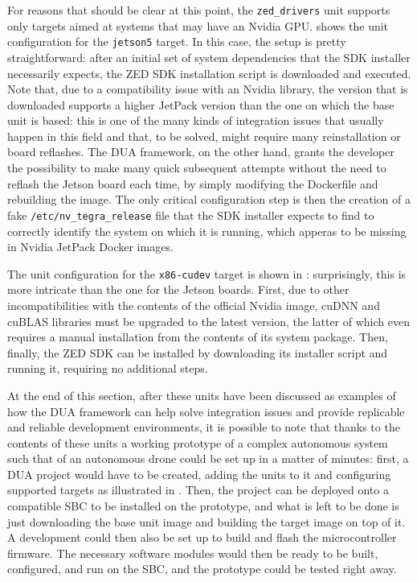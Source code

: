 For reasons that should be clear at this point, the \texttt{zed\_drivers} unit supports only targets aimed at systems that may have an Nvidia GPU.  shows the unit configuration for the \texttt{jetson5} target. In this case, the setup is pretty straightforward: after an initial set of system dependencies that the SDK installer necessarily expects, the ZED SDK installation script is downloaded and executed. Note that, due to a compatibility issue with an Nvidia library, the version that is downloaded supports a higher JetPack version than the one on which the base unit is based: this is one of the many kinds of integration issues that usually happen in this field and that, to be solved, might require many reinstallation or board reflashes. The DUA framework, on the other hand, grants the developer the possibility to make many quick subsequent attempts without the need to reflash the Jetson board each time, by simply modifying the Dockerfile and rebuilding the image. The only critical configuration step is then the creation of a fake \texttt{/etc/nv\_tegra\_release} file that the SDK installer expects to find to correctly identify the system on which it is running, which apperas to be missing in Nvidia JetPack Docker images.

The unit configuration for the \texttt{x86-cudev} target is shown in : surprisingly, this is more intricate than the one for the Jetson boards. First, due to other incompatibilities with the contents of the official Nvidia image, cuDNN \cite{nvidia_cuda_nodate} and cuBLAS libraries must be upgraded to the latest version, the latter of which even requires a manual installation from the contents of its system package. Then, finally, the ZED SDK can be installed by downloading its installer script and running it, requiring no additional steps.

At the end of this section, after these units have been discussed as examples of how the DUA framework can help solve integration issues and provide replicable and reliable development environments, it is possible to note that thanks to the contents of these units a working prototype of a complex autonomous system such that of an autonomous drone could be set up in a matter of minutes: first, a DUA project would have to be created, adding the units to it and configuring supported targets as illustrated in . Then, the project can be deployed onto a compatible SBC to be installed on the prototype, and what is left to be done is just downloading the base unit image and building the target image on top of it. A development could then also be set up to build and flash the microcontroller firmware. The necessary software modules would then be ready to be built, configured, and run on the SBC, and the prototype could be tested right away.

